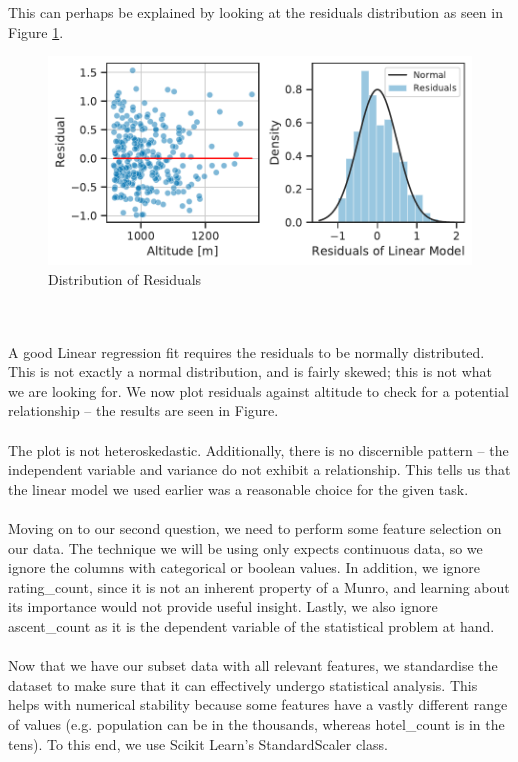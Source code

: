 \documentclass[11pt,a4paper]{article}
\begin{document}
This can perhaps be explained by looking at the residuals distribution as seen in Figure \ref{fds-project-template:fig:uni_residuals}.
\begin{figure} [h!]
  \centering
  \includegraphics{report/uni_residuals.pdf}
  \caption{Distribution of Residuals}
  \label{fds-project-template:fig:uni_residuals}
\end{figure} \\ \\ 
A good Linear regression fit requires the residuals to be normally distributed. This is not exactly a normal distribution, and is fairly skewed; this is not what we are looking for. We now plot residuals against altitude to check for a potential relationship – the results are seen in Figure. \\ \\
The plot is not heteroskedastic. Additionally, there is no discernible pattern – the independent variable and variance do not exhibit a relationship. This tells us that the linear model we used earlier was a reasonable choice for the given task. \\ \\
Moving on to our second question, we need to perform some feature selection on our data. The technique we will be using only expects continuous data, so we ignore the columns with categorical or boolean values. In addition, we ignore rating\_count, since it is not an inherent property of a Munro, and learning about its importance would not provide useful insight. Lastly, we also ignore ascent\_count as it is the dependent variable of the statistical problem at hand. \\ \\
Now that we have our subset data with all relevant features, we standardise the dataset to make sure that it can effectively undergo statistical analysis. This helps with numerical stability because some features have a vastly different range of values (e.g. population can be in the thousands, whereas hotel\_count is in the tens). To this end, we use Scikit Learn's StandardScaler class. \\ \\
\end{document}
